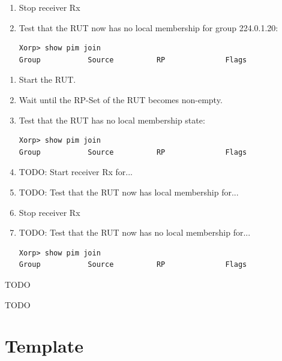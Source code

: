 \documentclass[11pt]{report}
\begin{document}
\begin{enumerate}
  \item Stop receiver Rx

  \item Test that the RUT now has no local membership for group 224.0.1.20:

\begin{verbatim}
Xorp> show pim join
Group           Source          RP              Flags
\end{verbatim}

\end{enumerate}


\begin{enumerate}

  \item Start the RUT.

  \item Wait until the RP-Set of the RUT becomes non-empty.

  \item Test that the RUT has no local membership state:

\begin{verbatim}
Xorp> show pim join
Group           Source          RP              Flags
\end{verbatim}

  \item TODO: Start receiver Rx for...

  \item TODO: Test that the RUT now has local membership for...

  \item Stop receiver Rx

  \item TODO: Test that the RUT now has no local membership for...

\begin{verbatim}
Xorp> show pim join
Group           Source          RP              Flags
\end{verbatim}

\end{enumerate}

TODO

TODO

\newpage
\section{Template}
\end{document}

